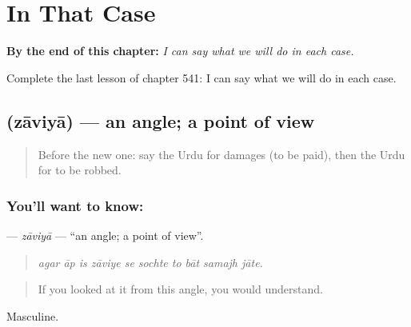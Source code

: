 
\chapter{In That Case}
\label{ch:ur-in-that-case}

\begin{chapteropening}
\textbf{By the end of this chapter:} \emph{I can say what we will do in each case.}

Complete the last lesson of chapter 541: I can say what we will do in each case.
\end{chapteropening}

\section[\texorpdfstring{\ur{زاویہ} (zāviyā)}{زاویہ (zāviyā)}]{ (zāviyā) — an angle; a point of view}

\label{lesson:UR-C541-zaviya}



\begin{quote}
Before the new one: say the Urdu for damages (to be paid), then the Urdu for to be robbed.
\end{quote}

\subsection*{You'll want to know: }
\textbf{} — \emph{zāviyā} — \textquotedblleft{}an angle; a point of view\textquotedblright{}.

\begin{quote}
         
\end{quote}

\begin{quote}
\emph{agar āp is zāviye se sochte to bāt samajh jāte.}
\end{quote}

\begin{quote}
If you looked at it from this angle, you would understand.
\end{quote}

Masculine.

